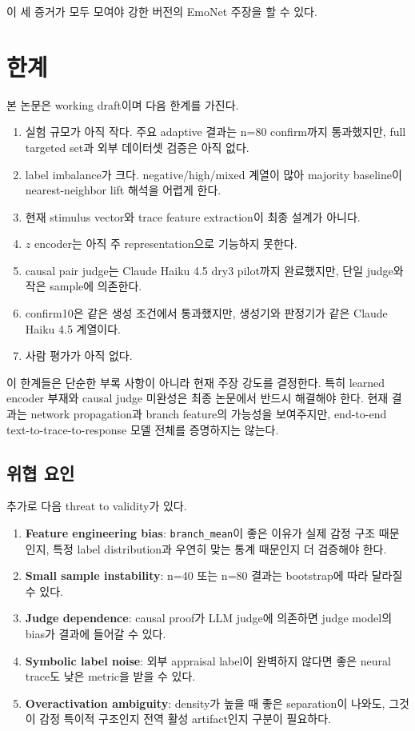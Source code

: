 \documentclass[11pt,a4paper]{article}
\begin{document}
이 세 증거가 모두 모여야 강한 버전의 EmoNet 주장을 할 수 있다.

\section{한계}

본 논문은 working draft이며 다음 한계를 가진다.

\begin{enumerate}
  \item 실험 규모가 아직 작다. 주요 adaptive 결과는 n=80 confirm까지 통과했지만, full targeted set과 외부 데이터셋 검증은 아직 없다.
  \item label imbalance가 크다. negative/high/mixed 계열이 많아 majority baseline이 nearest-neighbor lift 해석을 어렵게 한다.
  \item 현재 stimulus vector와 trace feature extraction이 최종 설계가 아니다.
  \item \(z\) encoder는 아직 주 representation으로 기능하지 못한다.
  \item causal pair judge는 Claude Haiku 4.5 dry3 pilot까지 완료했지만, 단일 judge와 작은 sample에 의존한다.
  \item confirm10은 같은 생성 조건에서 통과했지만, 생성기와 판정기가 같은 Claude Haiku 4.5 계열이다.
  \item 사람 평가가 아직 없다.
\end{enumerate}

이 한계들은 단순한 부록 사항이 아니라 현재 주장 강도를 결정한다. 특히 learned encoder 부재와 causal judge 미완성은 최종 논문에서 반드시 해결해야 한다. 현재 결과는 network propagation과 branch feature의 가능성을 보여주지만, end-to-end text-to-trace-to-response 모델 전체를 증명하지는 않는다.

\subsection{위협 요인}

추가로 다음 threat to validity가 있다.

\begin{enumerate}
  \item \textbf{Feature engineering bias}: \texttt{branch\_mean}이 좋은 이유가 실제 감정 구조 때문인지, 특정 label distribution과 우연히 맞는 통계 때문인지 더 검증해야 한다.
  \item \textbf{Small sample instability}: n=40 또는 n=80 결과는 bootstrap에 따라 달라질 수 있다.
  \item \textbf{Judge dependence}: causal proof가 LLM judge에 의존하면 judge model의 bias가 결과에 들어갈 수 있다.
  \item \textbf{Symbolic label noise}: 외부 appraisal label이 완벽하지 않다면 좋은 neural trace도 낮은 metric을 받을 수 있다.
  \item \textbf{Overactivation ambiguity}: density가 높을 때 좋은 separation이 나와도, 그것이 감정 특이적 구조인지 전역 활성 artifact인지 구분이 필요하다.
\end{enumerate}
\end{document}
